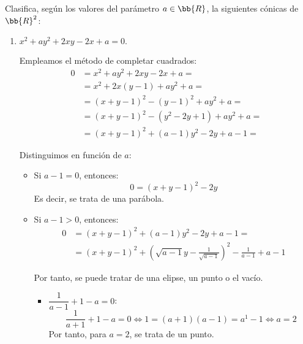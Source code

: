 \begin{ejercicio}
    Clasifica, según los valores del parámetro $a \in \bb{R}$, la siguientes cónicas de $\bb{R}^2$:
    \begin{enumerate}
        \item $x^2 + ay^2 + 2xy - 2x + a = 0.$
        
        Empleamos el método de completar cuadrados:
        \begin{equation*}
            \begin{split}
                0 &= x^2 + ay^2 + 2xy - 2x + a =\\
                &= x^2 + 2x(y-1) + ay^2 + a =\\
                &= (x+y-1)^2 - (y-1)^2 + ay^2 + a =\\
                &= (x+y-1)^2 - (y^2-2y+1) + ay^2 + a =\\
                &= (x+y-1)^2 + (a-1)y^2 -2y + a-1 =
            \end{split}
        \end{equation*}

        Distinguimos en función de $a$:
        \begin{itemize}
            \item Si $a-1=0$, entonces:
            \begin{equation*}
                0 = (x+y-1)^2 -2y
            \end{equation*}
            Es decir, se trata de una parábola.

            \item Si $a-1 > 0$, entonces:
            \begin{equation*}
                \begin{split}
                    0 &= (x+y-1)^2 + (a-1)y^2 -2y + a-1 = \\
                    &= (x+y-1)^2 + \left(\sqrt{a-1}y - \frac{1}{\sqrt{a-1}}\right)^2 - \frac{1}{a-1} + a-1
                \end{split}
            \end{equation*}
            
            Por tanto, se puede tratar de una elipse, un punto o el vacío.
            \begin{itemize}
                \item $\dfrac{1}{a-1} + 1-a = 0$:
                \begin{equation*}
                    \frac{1}{a+1} + 1-a = 0 \Longleftrightarrow 1 = (a+1)(a-1) = a^1 -1 \Longleftrightarrow a = 2
                \end{equation*}
                Por tanto, para $a=2$, se trata de un punto.


\end{itemize}
\end{itemize}
\end{enumerate}
\end{ejercicio}
